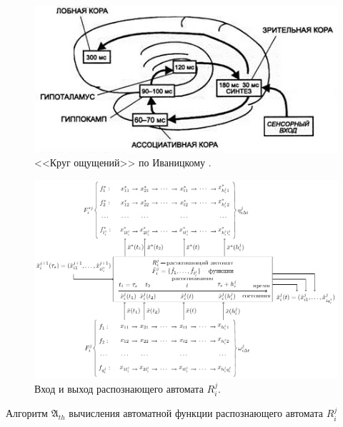 \documentclass[a4paper, 12pt]{article}
\theoremstyle{plain}
\newcommand{\stretchsize}{2}
\renewcommand{\baselinestretch}{\stretchsize}
\begin{document}
	\begin{figure}[p]
		\centering
		\includegraphics[width=0.7\linewidth]{ivanitsky_cyrcle}
		\caption{<<Круг ощущений>> по Иваницкому \cite{Aleksandrov2007}.}
		\label{fig:ivan_cyrcle}
	\end{figure}

	\begin{figure}[h]
		\centering
		\includegraphics[width=1.0\linewidth]{rb_io}
		\caption{Вход и выход распознающего автомата $R_i^j$.}
		\label{fig:rb_io}
	\end{figure}	
	
	\renewcommand{\baselinestretch}{1}
	\begin{algorithm}[p]
		\caption{Алгоритм $\mathfrak{A}_{th}$ вычисления автоматной функции распознающего автомата $R_i^j$}\label{alg:automato}
		\begin{algorithmic}[1]
			
			
		\end{algorithmic}
	\end{algorithm}
	\renewcommand{\baselinestretch}{\stretchsize}
\end{document}
